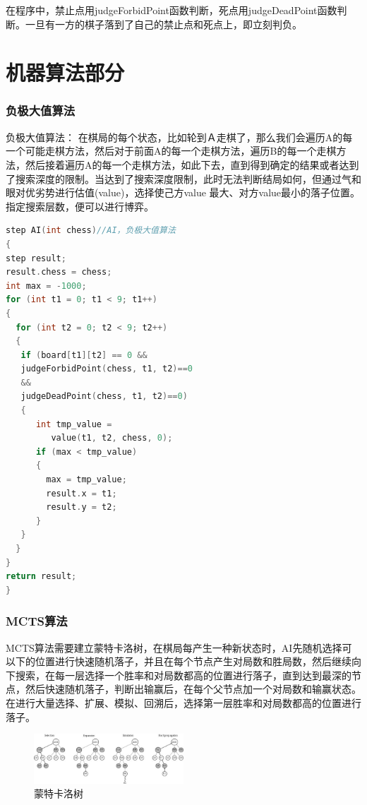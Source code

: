 \documentclass[twocolumn]{article}
\begin{document}
\par
在程序中，禁止点用judgeForbidPoint函数判断，死点用judgeDeadPoint函数判断。一旦有一方的棋子落到了自己的禁止点和死点上，即立刻判负。


\part{机器算法部分}
\section{负极大值算法}
负极大值算法：
在棋局的每个状态，比如轮到Ａ走棋了，那么我们会遍历A的每一个可能走棋方法，然后对于前面A的每一个走棋方法，遍历B的每一个走棋方法，然后接着遍历A的每一个走棋方法，如此下去，直到得到确定的结果或者达到了搜索深度的限制。当达到了搜索深度限制，此时无法判断结局如何，但通过气和眼对优劣势进行估值(value)，选择使己方value
最大、对方value最小的落子位置。指定搜索层数，便可以进行博弈。

\begin{lstlisting}[language=C++]
step AI(int chess)//AI，负极大值算法
{
step result;
result.chess = chess;
int max = -1000;
for (int t1 = 0; t1 < 9; t1++) 
{
  for (int t2 = 0; t2 < 9; t2++) 
  {
   if (board[t1][t2] == 0 &&
   judgeForbidPoint(chess, t1, t2)==0 
   &&
   judgeDeadPoint(chess, t1, t2)==0) 	                                
   {		
      int tmp_value = 
         value(t1, t2, chess, 0);
      if (max < tmp_value)
      {
        max = tmp_value;
        result.x = t1;
	    result.y = t2;
      }
   }
  }
}
return result;
}
\end{lstlisting}


\section{MCTS算法}
MCTS算法需要建立蒙特卡洛树，在棋局每产生一种新状态时，AI先随机选择可以下的位置进行快速随机落子，并且在每个节点产生对局数和胜局数，然后继续向下搜索，在每一层选择一个胜率和对局数都高的位置进行落子，直到达到最深的节点，然后快速随机落子，判断出输赢后，在每个父节点加一个对局数和输赢状态。在进行大量选择、扩展、模拟、回溯后，选择第一层胜率和对局数都高的位置进行落子。
\begin{figure}[H]
\centering  %
\includegraphics[width=0.5\textwidth]{fig51}
\caption{蒙特卡洛树}
\label{Fig.main}
\end{figure}
\end{document}
